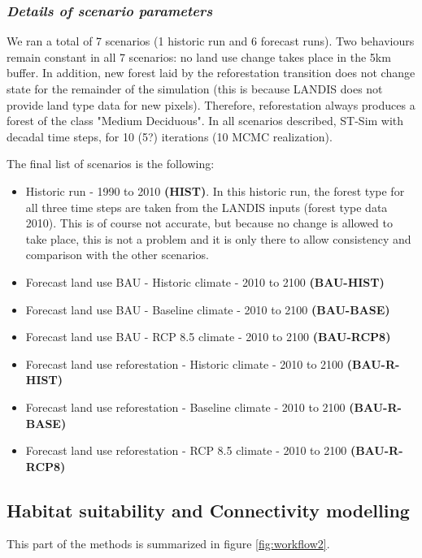 \subsubsection*{\textit{Details of scenario parameters}} 

We ran a total of 7 scenarios (1 historic run and 6 forecast runs). Two behaviours remain constant in all 7 scenarios: no land use change  takes place in the 5km buffer. In addition, new forest laid by the reforestation transition does not change state for the remainder of the simulation (this is because LANDIS does not provide land type data for new pixels). Therefore, reforestation always produces a forest of the class "Medium Deciduous". In all scenarios described, ST-Sim with decadal time steps, for 10 (5?) iterations (10 MCMC realization).

The final list of scenarios is the following:
\begin{itemize}
\item Historic run - 1990 to 2010 \textbf{(HIST)}. In this historic run, the forest type for all three time steps are taken from the LANDIS inputs (forest type data 2010). This is of course not accurate, but because no change is allowed to take place, this is not a problem and it is only there to allow consistency and comparison with the other scenarios.
\item Forecast land use BAU - Historic climate - 2010 to 2100 \textbf{(BAU-HIST)}
\item Forecast land use BAU - Baseline climate - 2010 to 2100 \textbf{(BAU-BASE)}
\item Forecast land use BAU - RCP 8.5 climate - 2010 to 2100 \textbf{(BAU-RCP8)}
\item Forecast land use reforestation - Historic climate - 2010 to 2100 \textbf{(BAU-R-HIST)}
\item Forecast land use reforestation - Baseline climate - 2010 to 2100 \textbf{(BAU-R-BASE)}
\item Forecast land use reforestation - RCP 8.5 climate - 2010 to 2100 \textbf{(BAU-R-RCP8)}\\
\end{itemize}

\subsection{Habitat suitability and Connectivity modelling}

This part of the methods is summarized in figure \ref{fig:workflow2}.

